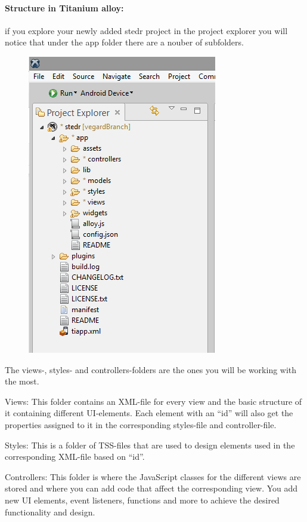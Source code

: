 \paragraph{Structure in Titanium alloy:}
if you explore your newly added stedr project in the project explorer you will notice that under the app folder there are a nouber of subfolders.

\begin{figure}
\begin{center}
\includegraphics[scale=0.45]{guide/f5.png} 
\end{center}
\end{figure}

The views-, styles- and controllers-folders are the ones you will be working with the most.

Views:
This folder contains an XML-file for every view and the basic structure of it containing different UI-elements. Each element with an “id” will also get the properties assigned to it in the corresponding styles-file and controller-file.

Styles:
This is a folder of TSS-files that are used to design elements used in the corresponding XML-file based on “id”.

Controllers:
This folder is where the JavaScript classes for the different views are stored and where you can add code that affect the corresponding view. You add new UI elements,  event listeners, functions and more to achieve the desired functionality and design.



